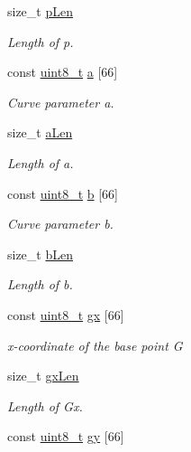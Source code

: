 \begin{DoxyCompactItemize}
size\+\_\+t \hyperlink{structEcCurveInfo_ab2badb15f033fc37e697df9247635126}{p\+Len}
\begin{DoxyCompactList}\small\item\em Length of p. \end{DoxyCompactList}\item 
const \hyperlink{stdint_8h_aba7bc1797add20fe3efdf37ced1182c5}{uint8\+\_\+t} \hyperlink{structEcCurveInfo_a6e4de3331be25436f89db95c81ff67fd}{a} \mbox{[}66\mbox{]}
\begin{DoxyCompactList}\small\item\em Curve parameter a. \end{DoxyCompactList}\item 
size\+\_\+t \hyperlink{structEcCurveInfo_a24c49b1312a87d743b431a9bcd034a82}{a\+Len}
\begin{DoxyCompactList}\small\item\em Length of a. \end{DoxyCompactList}\item 
const \hyperlink{stdint_8h_aba7bc1797add20fe3efdf37ced1182c5}{uint8\+\_\+t} \hyperlink{structEcCurveInfo_a1ccd0b43cdda7f8796588bcd4c8667ce}{b} \mbox{[}66\mbox{]}
\begin{DoxyCompactList}\small\item\em Curve parameter b. \end{DoxyCompactList}\item 
size\+\_\+t \hyperlink{structEcCurveInfo_a72ad006f6cca9613a1e50efe29191cf6}{b\+Len}
\begin{DoxyCompactList}\small\item\em Length of b. \end{DoxyCompactList}\item 
const \hyperlink{stdint_8h_aba7bc1797add20fe3efdf37ced1182c5}{uint8\+\_\+t} \hyperlink{structEcCurveInfo_af597b54fc23acc8720b3e3437a02fe97}{gx} \mbox{[}66\mbox{]}
\begin{DoxyCompactList}\small\item\em x-\/coordinate of the base point G \end{DoxyCompactList}\item 
size\+\_\+t \hyperlink{structEcCurveInfo_a07f921dede7646b015a3c5f6f439561c}{gx\+Len}
\begin{DoxyCompactList}\small\item\em Length of Gx. \end{DoxyCompactList}\item 
const \hyperlink{stdint_8h_aba7bc1797add20fe3efdf37ced1182c5}{uint8\+\_\+t} \hyperlink{structEcCurveInfo_ae82180f4fb48879aed2d8939c004fc3d}{gy} \mbox{[}66\mbox{]}

\end{DoxyCompactItemize}

